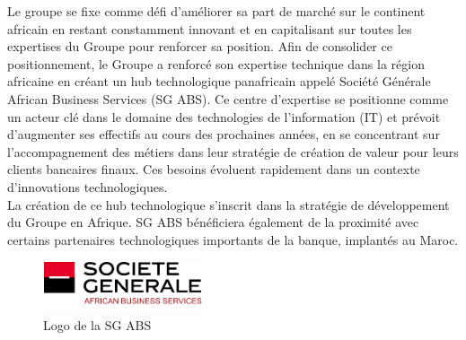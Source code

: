 Le groupe se fixe comme défi d'améliorer sa part de marché sur le continent africain en restant constamment innovant et en capitalisant sur toutes les expertises du Groupe pour renforcer sa position. Afin de consolider ce positionnement, le Groupe a renforcé son expertise technique dans la région africaine en créant un hub technologique panafricain appelé Société Générale African Business Services (SG ABS). Ce centre d'expertise se positionne comme un acteur clé dans le domaine des technologies de l'information (IT) et prévoit d'augmenter ses effectifs au cours des prochaines années, en se concentrant sur l'accompagnement des métiers dans leur stratégie de création de valeur pour leurs clients bancaires finaux. Ces besoins évoluent rapidement dans un contexte d'innovations technologiques.\\

La création de ce hub technologique s'inscrit dans la stratégie de développement du Groupe en Afrique. SG ABS bénéficiera également de la proximité avec certains partenaires technologiques importants de la banque, implantés au Maroc.\\

\begin{figure}[!h]
    \centering %
        \includegraphics[height=1.5cm]{images/logos/SG_ABS.png}
    \caption{Logo de la SG ABS}
\end{figure}

